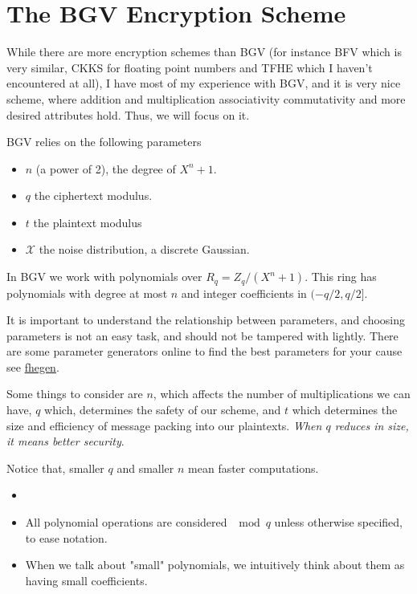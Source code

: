 \section{The BGV Encryption Scheme}

While there are more encryption schemes than BGV (for instance BFV which is very similar,
 CKKS for floating point numbers and TFHE which I haven't encountered at all),
I have most of my experience with BGV, and it is very nice scheme, 
where addition and multiplication associativity commutativity and more desired attributes 
hold.  Thus, we will focus on it.


BGV relies on the following parameters
\begin{itemize}
    \item $n$ (a power of 2), the degree of $X^n+1$.
    \item $q$ the ciphertext modulus.
    \item $t$ the plaintext modulus
    \item $\mathcal{X}$ the noise distribution, a discrete Gaussian.
\end{itemize}

In BGV we work with polynomials over $R_q=Z_q/(X^n+1)$.
This ring has polynomials with degree at most $n$ and integer coefficients in $(-q/2,q/2]$.

\begin{remark}
    It is important to understand the relationship between parameters, and choosing parameters 
    is not an easy task, and should not be tampered with lightly.
    There are some parameter generators online to find the best parameters
     for your cause see \href{https://github.com/Crypto-TII/fhegen}{fhegen}.
    
    Some things to consider are $n$, which affects the number of multiplications we can have,
    $q$ which, determines the safety of our scheme, and $t$ which determines 
    the size and efficiency of message packing into our plaintexts. 
    \emph{When $q$ reduces in size, it means better security}.    

    Notice that, smaller $q$ and smaller $n$ mean faster computations.
\end{remark}


\begin{remark}
    \begin{itemize}
        \item \red{check: I think we can treat coefficients as they were in $(0,q]$.}
        \item All polynomial operations are considered $\mod q$
         unless otherwise specified, to ease notation.
         \item When we talk about "small" polynomials, 
         we intuitively think about them as having small coefficients.
    \end{itemize}
\end{remark}

